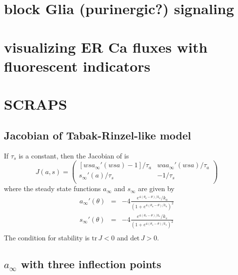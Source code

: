 \documentclass[12pt]{article}
\def\taua{\tau_a}
\def\taus{\tau_s}
\def\thetaa{\theta_a}
\def\ka{k_a}
\def\thetas{\theta_s}
\def\ks{k_s}
\def\ainf{a_\infty}
\def\sinf{s_\infty}
\begin{document}
\section*{block Glia (purinergic?) signaling}

\section*{visualizing ER Ca fluxes with fluorescent indicators}

\nocite{TabakEtal00,TabakEtal01,TabakRinzel05}




\newpage

\section*{SCRAPS}


\subsection*{Jacobian of Tabak-Rinzel-like model}

If $\taus$ is a constant, then 
the Jacobian of  is 
\begin{equation*}
    J (a,s) = \begin{pmatrix}
     \left[ ws\ainf'(wsa)-1\right]/\taua  &     wa\ainf'(wsa) /\taua \\
     \sinf'(a)/\taus & -1/\taus \\
    \end{pmatrix}
\end{equation*}
where 
the steady state functions $\ainf$ and $\sinf$ are given by 
\begin{eqnarray}
\ainf'(\theta) &=& -4\frac{e^{4(\thetaa-\theta)/\ka}/\ka}{\left( 1+e^{4(\thetaa-\theta)/\ka} \right)^2 }  \nonumber \\
\sinf'(\theta) &=& -4\frac{e^{4(\thetas-\theta)/\ks}/\ks}{\left( 1+e^{4(\thetas-\theta)/\ks} \right)^2 }  \nonumber \\ \nonumber 
\end{eqnarray}
The condition for stability is $\mbox{tr}\, J < 0$ and $\mbox{det}\,J>0$.


\subsection*{\boldmath $\ainf$ with three inflection points}
\end{document}
